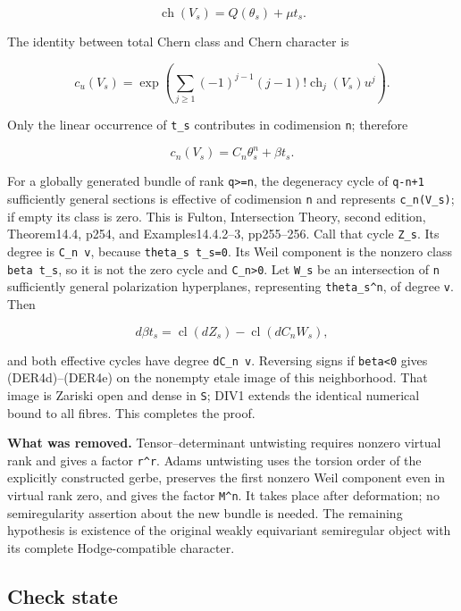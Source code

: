\documentclass[11pt,a4paper]{article}
\theoremstyle{definition}
\begin{document}
\[
 \operatorname{ch}(V_s)=Q(\theta_s)+\mu t_s.
\]

The identity between total Chern class and Chern character is

\[
 c_u(V_s)=\exp\left(\sum_{j\ge1}(-1)^{j-1}(j-1)!
 \operatorname{ch}_j(V_s)u^j\right).
\]

Only the linear occurrence of \texttt{t\_s} contributes in codimension
\texttt{n}; therefore

\[
 c_n(V_s)=C_n\theta_s^n+\beta t_s.
\tag{DER4g}
\]

For a globally generated bundle of rank \texttt{q\textgreater{}=n}, the
degeneracy cycle of \texttt{q-n+1} sufficiently general sections is
effective of codimension \texttt{n} and represents \texttt{c\_n(V\_s)};
if empty its class is zero. This is Fulton, Intersection Theory, second
edition, Theorem14.4, p254, and Examples14.4.2--3, pp255--256. Call that
cycle \texttt{Z\_s}. Its degree is \texttt{C\_n\ v}, because
\texttt{theta\_s\ t\_s=0}. Its Weil component is the nonzero class
\texttt{beta\ t\_s}, so it is not the zero cycle and
\texttt{C\_n\textgreater{}0}. Let \texttt{W\_s} be an intersection of
\texttt{n} sufficiently general polarization hyperplanes, representing
\texttt{theta\_s\^{}n}, of degree \texttt{v}. Then

\[
 d\beta t_s=\operatorname{cl}(dZ_s)
             -\operatorname{cl}(dC_n W_s),
\]

and both effective cycles have degree \texttt{dC\_n\ v}. Reversing signs
if \texttt{beta\textless{}0} gives (DER4d)--(DER4e) on the nonempty
etale image of this neighborhood. That image is Zariski open and dense
in \texttt{S}; DIV1 extends the identical numerical bound to all fibres.
This completes the proof.

\textbf{What was removed.} Tensor--determinant untwisting requires
nonzero virtual rank and gives a factor \texttt{r\^{}r}. Adams
untwisting uses the torsion order of the explicitly constructed gerbe,
preserves the first nonzero Weil component even in virtual rank zero,
and gives the factor \texttt{M\^{}n}. It takes place after deformation;
no semiregularity assertion about the new bundle is needed. The
remaining hypothesis is existence of the original weakly equivariant
semiregular object with its complete Hodge-compatible character.

\subsection{Check state}\label{check-state}
\end{document}
